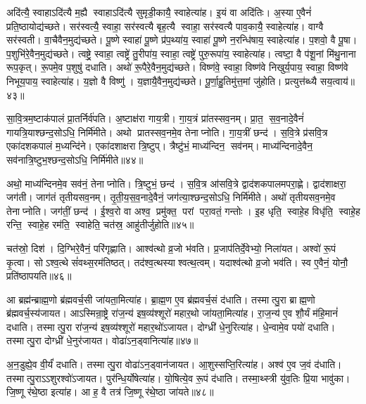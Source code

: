 अदि॑त्यै॒ स्वाहाऽदि॑त्यै म॒ह्यै स्वाहाऽदि॑त्यै सुमृडी॒कायै॒ स्वाहेत्या॑ह। इ॒यं वा अदि॑तिः। अ॒स्या ए॒वैनं॑ प्रति॒ष्ठायोद्य॑च्छते। सर॑स्वत्यै॒ स्वाहा॒ सर॑स्वत्यै बृह॒त्यै स्वाहा॒ सर॑स्वत्यै पाव॒कायै॒ स्वाहेत्या॑ह। वाग्वै सर॑स्वती। वा॒चैवैन॒मुद्य॑च्छते। पू॒ष्णे स्वाहा॑ पू॒ष्णे प्र॑प॒थ्या॑य॒ स्वाहा॑ पू॒ष्णे न॒रन्धि॑षाय॒ स्वाहेत्या॑ह। प॒शवो॒ वै पू॒षा। प॒शुभि॑रे॒वैन॒मुद्य॑च्छते। त्वष्ट्रे॒ स्वाहा॒ त्वष्ट्रे॑ तु॒रीपा॑य॒ स्वाहा॒ त्वष्ट्रे॑ पुरु॒रूपा॑य॒ स्वाहेत्या॑ह। त्वष्टा॒ वै प॑शू॒नां मि॑थु॒नाना रूप॒कृत्। रू॒पमे॒व प॒शुषु॑ दधाति। अथो॑ रू॒पैरे॒वैन॒मुद्य॑च्छते। विष्ण॑वे॒ स्वाहा॒ विष्ण॑वे निखुर्य॒पाय॒ स्वाहा॒ विष्ण॑वे निभूय॒पाय॒ स्वाहेत्या॑ह। य॒ज्ञो वै विष्णु॑। य॒ज्ञायै॒वैन॒मुद्य॑च्छते। पू॒र्णा॒हु॒तिमु॑त्त॒मां जु॑होति। प्रत्युत्त॑ब्ध्यै सय॒त्वाय॑॥४३॥\anuvakamend[य॒च्छ॒ते॒ पु॒रु॒रूपा॑य॒ स्वाहेत्या॑हा॒ष्टौ च॑]

सा॒वि॒त्रम॒ष्टाक॑पालं प्रा॒तर्निर्व॑पति। अ॒ष्टाक्ष॑रा गाय॒त्री। गा॒य॒त्रं प्रा॑तस्सव॒नम्। प्रा॒त॒ स॒व॒नादे॒वैनं॑ गायत्रि॒याश्छन्द॒सोऽधि॒ निर्मि॑मीते। अथो प्रातस्सव॒नमे॒व तेनाप्नोति। गा॒य॒त्रीं छन्द॑। स॒वि॒त्रे प्र॑सवि॒त्र एका॑दशकपालं म॒ध्यन्दि॑ने। एका॑दशाक्षरा त्रि॒ष्टुप्। त्रैष्टु॑भं॒ माध्य॑न्दिन॒ सव॑नम्। माध्य॑न्दिनादे॒वैन॒ सव॑नात्रि॒ष्टुभ॒श्छन्द॒सोऽधि॒ निर्मि॑मीते॥४४॥

अथो॒ माध्य॑न्दिनमे॒व सव॑नं॒ तेनाप्नोति। त्रि॒ष्टुभं॒ छन्द॑। स॒वि॒त्र आ॑सवि॒त्रे द्वाद॑शकपालमपरा॒ह्णे। द्वाद॑शाक्षरा॒ जग॑ती। जाग॑तं तृतीयसव॒नम्। तृ॒ती॒य॒स॒व॒नादे॒वैनं॒ जग॑त्या॒श्छन्द॒सोऽधि॒ निर्मि॑मीते। अथो॑ तृतीयसव॒नमे॒व तेनाप्नोति। जग॑तीं॒ छन्द॑। ई॒श्व॒रो वा अश्व॒ प्रमु॑क्त॒ परां परा॒वतं॒ गन्तोः। इ॒ह धृति॒ स्वाहे॒ह विधृ॑ति॒ स्वाहे॒ह रन्ति॒ स्वाहे॒ह रम॑ति॒ स्वाहेति॒ चत॑स्र॒ आहु॑तीर्जुहोति॥४५॥

चत॑स्रो॒ दिश॑। दि॒ग्भिरे॒वैनं॒ परि॑गृह्णाति। आश्व॑त्थो व्र॒जो भ॑वति। प्र॒जाप॑तिर्दे॒वेभ्यो॒ निला॑यत। अश्वो॑ रू॒पं कृ॒त्वा। सोऽश्व॒त्थे सं॑वथ्स॒रम॑तिष्ठत्। तद॑श्व॒त्थस्याश्वत्थ॒त्वम्। यदाश्व॑त्थो व्र॒जो भव॑ति। स्व ए॒वैनं॒ योनौ॒ प्रति॑ष्ठापयति॥४६॥\anuvakamend[त्रि॒ष्टुभ॒श्छन्द॒सोऽधि॒ निर्मि॑मीते जुहोति॒ नव॑ च]

आ ब्रह्म॑न्ब्राह्म॒णो ब्र॑ह्मवर्च॒सी जा॑यता॒मित्या॑ह। ब्रा॒ह्म॒ण ए॒व ब्र॑ह्मवर्च॒सं द॑धाति। तस्मात्पु॒रा ब्राह्म॒णो ब्र॑ह्मवर्च॒स्य॑जायत। आऽस्मिन्रा॒ष्ट्रे रा॑ज॒न्य॑ इष॒व्य॑श्शूरो॑ महार॒थो जा॑यता॒मित्या॑ह। रा॒ज॒न्य॑ ए॒व शौ॒र्यं म॑हि॒मानं॑ दधाति। तस्मात्पु॒रा रा॑ज॒न्य॑ इष॒व्य॑श्शूरो॑ महार॒थो॑ऽजायत। दोग्ध्री॑ धे॒नुरित्या॑ह। धे॒न्वामे॒व पयो॑ दधाति। तस्मात्पु॒रा दोग्ध्री॑ धे॒नुर॑जायत। वोढा॑ऽन॒ड्वानित्या॑ह॥४७॥

अ॒न॒डुह्ये॒व वी॒र्यं॑ दधाति। तस्मात्पु॒रा वोढा॑ऽन॒ड्वान॑जायत। आ॒शुस्सप्ति॒रित्या॑ह। अश्व॑ ए॒व ज॒वं द॑धाति। तस्मात्पु॒राऽऽशुरश्वो॑ऽजायत। पुर॑न्धि॒र्योषेत्या॑ह। यो॒षित्ये॒व रू॒पं द॑धाति। तस्मा॒थ्स्त्री यु॑व॒तिः प्रि॒या भावु॑का। जि॒ष्णू र॑थे॒ष्ठा इत्या॑ह। आ ह॒ वै तत्र॑ जि॒ष्णू र॑थे॒ष्ठा जा॑यते॥४८॥

